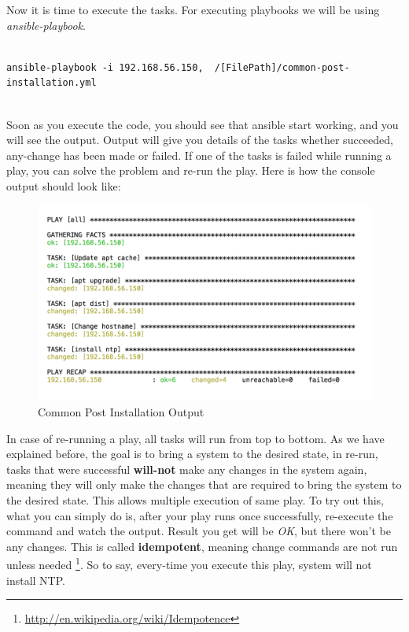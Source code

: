 \documentclass[10pt]{book}
\begin{document}
Now it is time to execute the tasks. For 
executing playbooks we will be using \emph{ansible-playbook}.

\begin{Verbatim} 

ansible-playbook -i 192.168.56.150,  /[FilePath]/common-post-installation.yml 
  
\end{Verbatim}

Soon as you execute the code, you should see that ansible start working, and you 
will see the output. Output will give you details of the tasks whether succeeded, 
any-change has been made or failed. If one of the tasks is failed while running a play, 
you can solve the problem and re-run the play. Here is how the console output should look like:


\begin{figure}[ht]
	\centering
  \includegraphics[width=1.0\textwidth]{figures/common-post-installation-output.png}
	\caption{Common Post Installation Output}
\end{figure}

In case of re-running a play, all tasks will run from top to bottom. As we have 
explained before, the goal is to bring a system to the desired state, in re-run, 
tasks that were successful \textbf{will-not} make any changes in the system again, 
meaning they will only make the changes that are required to bring the system to the desired 
state. This allows multiple execution of same play. To try out this, what you 
can simply do is, after your play runs once successfully, re-execute the command 
and watch the output. Result you get will be \textit{OK}, but there won't be 
any changes. This is called \textbf{idempotent}, meaning change commands are not run unless 
needed \footnote {\url{http://en.wikipedia.org/wiki/Idempotence}}. So to say, every-time you execute this play, system will not install 
NTP.
\end{document}
